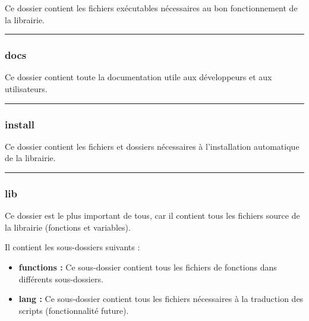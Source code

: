 \documentclass[a4paper,10pt]{article}
\begin{document}
\begin{justify}
    Ce dossier contient les fichiers exécutables nécessaires au bon fonctionnement de la librairie.
\end{justify}


\color{blue}\par\noindent\rule{\textwidth}{0.4pt}\color{white}

\color{blue}
\subsubsection{docs}\color{white}

\begin{justify}
    Ce dossier contient toute la documentation utile aux développeurs et aux utilisateurs.
\end{justify}


\color{blue}\par\noindent\rule{\textwidth}{0.4pt}\color{white}

\color{blue}
\subsubsection{install}\color{white}

\begin{justify}
    Ce dossier contient les fichiers et dossiers nécessaires à l'installation automatique de la librairie.
\end{justify}


\color{blue}\par\noindent\rule{\textwidth}{0.4pt}\color{white}

\color{blue}
\subsubsection{lib}\color{white}

\begin{justify}
    Ce dossier est le plus important de tous, car il contient tous les fichiers source de la librairie (fonctions et variables).
\end{justify}


\begin{justify}
    Il contient les sous-dossiers suivants :

    \begin{itemize}
        \item \textbf{\color{lime}functions\color{white} :} Ce sous-dossier contient tous les fichiers de fonctions dans différents sous-dossiers.\\

        \item \textbf{\color{lime}lang\color{white} :} Ce sous-dossier contient tous les fichiers nécessaires à la traduction des scripts (fonctionnalité future).
    \end{itemize}
\end{justify}
\end{document}
